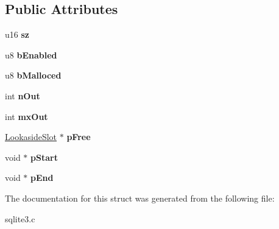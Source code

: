 \subsection*{Public Attributes}
\begin{DoxyCompactItemize}
\item 
\hypertarget{struct_lookaside_a2e8346b6cebbb64d9a6886a19ef843a1}{u16 {\bfseries sz}}\label{struct_lookaside_a2e8346b6cebbb64d9a6886a19ef843a1}

\item 
\hypertarget{struct_lookaside_adbe2c3486f893c30525e19388f35eb21}{u8 {\bfseries b\-Enabled}}\label{struct_lookaside_adbe2c3486f893c30525e19388f35eb21}

\item 
\hypertarget{struct_lookaside_a218f14cf9eb2c430867d286e9ac57ac5}{u8 {\bfseries b\-Malloced}}\label{struct_lookaside_a218f14cf9eb2c430867d286e9ac57ac5}

\item 
\hypertarget{struct_lookaside_a4cdd49fa554f877928d5bb31d55b32e9}{int {\bfseries n\-Out}}\label{struct_lookaside_a4cdd49fa554f877928d5bb31d55b32e9}

\item 
\hypertarget{struct_lookaside_a2ce364d95b55913df986999de442e4f9}{int {\bfseries mx\-Out}}\label{struct_lookaside_a2ce364d95b55913df986999de442e4f9}

\item 
\hypertarget{struct_lookaside_a318d2faa7f976f9d1b3c6e08bdc1d992}{\hyperlink{struct_lookaside_slot}{Lookaside\-Slot} $\ast$ {\bfseries p\-Free}}\label{struct_lookaside_a318d2faa7f976f9d1b3c6e08bdc1d992}

\item 
\hypertarget{struct_lookaside_a47073fcdffdc5a7a1464f0d09bfc17f9}{void $\ast$ {\bfseries p\-Start}}\label{struct_lookaside_a47073fcdffdc5a7a1464f0d09bfc17f9}

\item 
\hypertarget{struct_lookaside_ad3555c5558e104f2b82f62bf642cf831}{void $\ast$ {\bfseries p\-End}}\label{struct_lookaside_ad3555c5558e104f2b82f62bf642cf831}

\end{DoxyCompactItemize}


The documentation for this struct was generated from the following file\-:\begin{DoxyCompactItemize}
\item 
sqlite3.\-c\end{DoxyCompactItemize}
